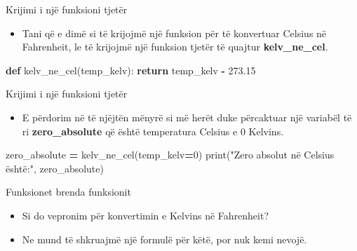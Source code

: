 \documentclass[
  ignorenonframetext,
]{beamer}
\newenvironment{Shaded}{\begin{snugshade}}{\end{snugshade}}
\newcommand{\BuiltInTok}[1]{#1}
\newcommand{\ControlFlowTok}[1]{\textcolor[rgb]{0.13,0.29,0.53}{\textbf{#1}}}
\newcommand{\DecValTok}[1]{\textcolor[rgb]{0.00,0.00,0.81}{#1}}
\newcommand{\FloatTok}[1]{\textcolor[rgb]{0.00,0.00,0.81}{#1}}
\newcommand{\KeywordTok}[1]{\textcolor[rgb]{0.13,0.29,0.53}{\textbf{#1}}}
\newcommand{\NormalTok}[1]{#1}
\newcommand{\OperatorTok}[1]{\textcolor[rgb]{0.81,0.36,0.00}{\textbf{#1}}}
\newcommand{\StringTok}[1]{\textcolor[rgb]{0.31,0.60,0.02}{#1}}
\providecommand{\tightlist}{%
  \setlength{\itemsep}{0pt}\setlength{\parskip}{0pt}}
\begin{document}
\begin{frame}[fragile]{Krijimi i një funksioni tjetër}
\protect\hypertarget{krijimi-i-njuxeb-funksioni-tjetuxebr}{}
\begin{itemize}
\tightlist
\item
  Tani që e dimë si të krijojmë një funksion për të konvertuar Celsius
  në Fahrenheit, le të krijojmë një funksion tjetër të quajtur
  \textbf{kelv\_ne\_cel}.
\end{itemize}

\begin{Shaded}
\begin{Highlighting}[]
\KeywordTok{def}\NormalTok{ kelv\_ne\_cel(temp\_kelv):}
    \ControlFlowTok{return}\NormalTok{ temp\_kelv }\OperatorTok{{-}} \FloatTok{273.15}
\end{Highlighting}
\end{Shaded}
\end{frame}

\begin{frame}[fragile]{Krijimi i një funksioni tjetër}
\protect\hypertarget{krijimi-i-njuxeb-funksioni-tjetuxebr-1}{}
\begin{itemize}
\tightlist
\item
  E përdorim në të njëjtën mënyrë si më herët duke përcaktuar një
  variabël të ri \textbf{zero\_absolute} që është temperatura Celsius e
  0 Kelvins.
\end{itemize}

\begin{Shaded}
\begin{Highlighting}[]
\NormalTok{zero\_absolute }\OperatorTok{=}\NormalTok{ kelv\_ne\_cel(temp\_kelv}\OperatorTok{=}\DecValTok{0}\NormalTok{)}
\BuiltInTok{print}\NormalTok{(}\StringTok{"Zero absolut në Celsius është:"}\NormalTok{, zero\_absolute)}
\end{Highlighting}
\end{Shaded}
\end{frame}

\begin{frame}{Funksionet brenda funksionit}
\protect\hypertarget{funksionet-brenda-funksionit}{}
\begin{itemize}
\item
  Si do vepronim për konvertimin e Kelvins në Fahrenheit?
\item
  Ne mund të shkruajmë një formulë për këtë, por nuk kemi nevojë.
\end{itemize}
\end{frame}
\end{document}
